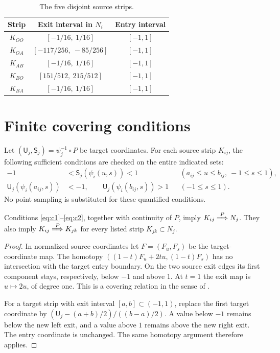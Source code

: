 \begin{table}[ht]
\centering
\begin{tabular}{@{}c cc@{}}\toprule
Strip & Exit interval in $N_i$ & Entry interval\\\midrule
$K_{OO}$ & $[-1/16,\ 1/16]$ & $[-1,1]$\\
$K_{OA}$ & $[-117/256,\ -85/256]$ & $[-1,1]$\\
$K_{AB}$ & $[-1/16,\ 1/16]$ & $[-1,1]$\\
$K_{BO}$ & $[151/512,\ 215/512]$ & $[-1,1]$\\
$K_{BA}$ & $[-1/16,\ 1/16]$ & $[-1,1]$\\\bottomrule
\end{tabular}
\caption{The five disjoint source strips.}
\label{tab:strips}
\end{table}

\section{Finite covering conditions}\label{sec:cover}

Let $(\mathsf U_j,\mathsf S_j)=\psi_j^{-1}\circ P$ be target coordinates.
For each source strip $K_{ij}$, the following sufficient conditions are
checked on the entire indicated sets:
\begin{align}
 -1&<\mathsf S_j(\psi_i(u,s))<1
 &&(a_{ij}\leq u\leq b_{ij},\ -1\leq s\leq1),\tag{C1}\label{eq:c1}\\
 \mathsf U_j(\psi_i(a_{ij},s))&<-1,\qquad
 \mathsf U_j(\psi_i(b_{ij},s))>1
 &&(-1\leq s\leq1).\tag{C2}\label{eq:c2}
\end{align}
No point sampling is substituted for these quantified conditions.

\begin{lemma}\label{lem:cover}
Conditions \eqref{eq:c1}--\eqref{eq:c2}, together with continuity of $P$, imply
$K_{ij}\mathrel{\overset{P}{\Longrightarrow}} N_j$. They also imply $K_{ij}\mathrel{\overset{P}{\Longrightarrow}} K_{jk}$ for every listed strip
$K_{jk}\subset N_j$.
\end{lemma}
\begin{proof}
In normalized source coordinates let $F=(F_u,F_s)$ be the target-coordinate
map. The homotopy
$((1-t)F_u+2tu,(1-t)F_s)$ has no intersection with the target entry boundary.
On the two source exit edges its first component stays, respectively, below
$-1$ and above $1$. At $t=1$ the exit map is $u\mapsto2u$, of degree one.
This is a covering relation in the sense of \cite{ZG}.

For a target strip with exit interval $[a,b]\subset(-1,1)$, replace the first
target coordinate by $(\mathsf U_j-(a+b)/2)/((b-a)/2)$. A value below $-1$
remains below the new left exit, and a value above $1$ remains above the new
right exit. The entry coordinate is unchanged. The same homotopy argument
therefore applies.
\end{proof}

